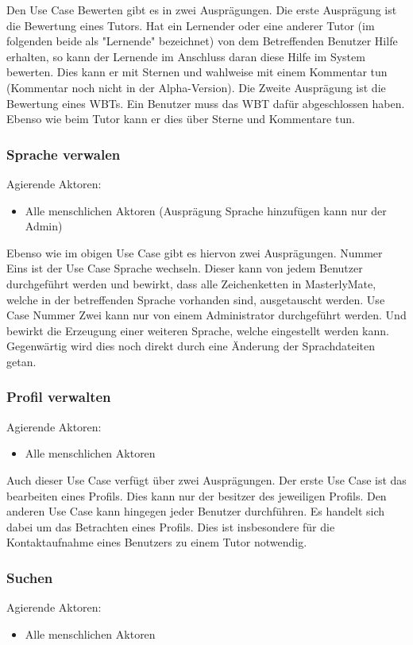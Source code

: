 Den Use Case Bewerten gibt es in zwei Ausprägungen. Die erste Ausprägung ist die
Bewertung eines Tutors. Hat ein Lernender oder eine anderer Tutor (im folgenden
beide als "Lernende" bezeichnet) von dem Betreffenden Benutzer Hilfe erhalten,
so kann der Lernende im Anschluss daran diese Hilfe im System bewerten.
Dies kann er mit Sternen und wahlweise mit einem Kommentar tun (Kommentar noch
nicht in der Alpha-Version). Die Zweite Ausprägung ist die Bewertung eines WBTs.
Ein Benutzer muss das WBT dafür abgeschlossen haben. Ebenso wie beim Tutor kann
er dies über Sterne und Kommentare tun.
	
\subsubsection{Sprache verwalen}
Agierende Aktoren: \begin{itemize}
  \item Alle menschlichen Aktoren (Ausprägung Sprache
hinzufügen kann nur der Admin)
\end{itemize}

Ebenso wie im obigen Use Case gibt es hiervon zwei Ausprägungen.
Nummer Eins ist der Use Case Sprache wechseln. Dieser kann von jedem Benutzer
durchgeführt werden und bewirkt, dass alle Zeichenketten in MasterlyMate, welche
in der betreffenden Sprache vorhanden sind, ausgetauscht werden. Use Case Nummer
Zwei kann nur von einem Administrator durchgeführt werden. Und bewirkt die
Erzeugung einer weiteren Sprache, welche eingestellt werden kann. Gegenwärtig
wird dies noch direkt durch eine Änderung der Sprachdateiten getan.

\subsubsection{Profil verwalten}
Agierende Aktoren: \begin{itemize}
  \item Alle menschlichen Aktoren
\end{itemize}

Auch dieser Use Case verfügt über zwei Ausprägungen. Der erste Use Case ist das
bearbeiten eines Profils. Dies kann nur der besitzer des jeweiligen Profils.
Den anderen Use Case kann hingegen jeder Benutzer durchführen. Es handelt sich
dabei um das Betrachten eines Profils. Dies ist insbesondere für die
Kontaktaufnahme eines Benutzers zu einem Tutor notwendig.

\subsubsection{Suchen}
Agierende Aktoren: \begin{itemize}
  \item Alle menschlichen Aktoren
\end{itemize}

